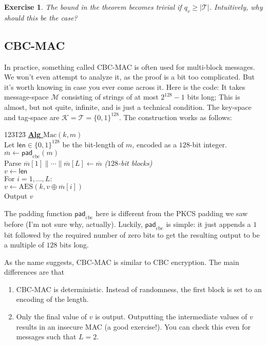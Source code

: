 \documentclass[11pt]{article}
\newtheorem{exercise}{Exercise}
\newcommand{\msgs}{\mathcal{M}}
\newcommand{\keys}{\mathcal{K}}
\newcommand{\MAC}{\mathrm{Mac}}
\newcommand{\tags}{\mathcal{T}}
\newcommand{\leng}{\mathsf{len}}
\newcommand{\algorithm}[1]{\textbf{Alg} {#1}}
\newcommand{\bits}{\{0,1\}}
\newcommand{\barm}{\overline{m}}
\newcommand{\aes}{\mathrm{AES}}
\newcommand{\cbcmacpad}{\mathsf{pad}_{\mathrm{cbc}}}
\begin{document}
\begin{exercise}
    The bound in the theorem becomes trivial if $q_v \geq |\tags|$. Intuitively,
    why should this be the case?
\end{exercise}

\subsection{CBC-MAC} 

In practice, something called CBC-MAC is often used for multi-block messages.
We won't even attempt to analyze it, as the proof is a bit too complicated. But
it's worth knowing in case you ever come across it. Here is the code: It takes
message-space $\msgs$ consisting of strings of at most $2^{128}-1$ bits long;
This is almost, but not quite, infinite, and is just a technical condition. The
key-space and tag-space are $\keys=\tags=\bits^{128}$. The construction works
as follows:
\begin{center}
        \begin{minipage}{2in}\begin{tabbing}
            123\=123\=\kill
            \underline{\algorithm{$\MAC(k,m)$}} \\[2pt]
            \> Let $\leng\in\bits^{128}$ be the bit-length of $m$, encoded
            as a $128$-bit integer.\\
            \> $\barm \gets \cbcmacpad(m)$\\
            \> Parse $\barm[1]\|\cdots\|\barm[L]\gets\barm$  \emph{($128$-bit
            blocks)}\\
            \> $v \gets \leng$ \\
            \> For $i=1,\ldots,L$: \\
            \> \> $v \gets \aes(k,v\oplus\barm[i])$\\
            \> Output $v$
        \end{tabbing}\end{minipage}
    \end{center}
The padding function $\cbcmacpad$ here is different from the PKCS padding we
saw before (I'm not sure why, actually). Luckily, $\cbcmacpad$ is simple:
it just appends a $1$ bit followed by the required number of zero bits to
get the resulting output to be a multiple of $128$ bits long.

As the name suggests,
CBC-MAC is similar to CBC encryption. The main differences are that 
\begin{enumerate}

    \item CBC-MAC is  deterministic. Instead of randomness, the first
        block is set to an encoding of the length.

    \item Only the final value of $v$ is output. Outputting the intermediate
        values of $v$ results in an insecure MAC (a good exercise!). You can
        check this even for messages such that $L=2$.

\end{enumerate}
\end{document}
